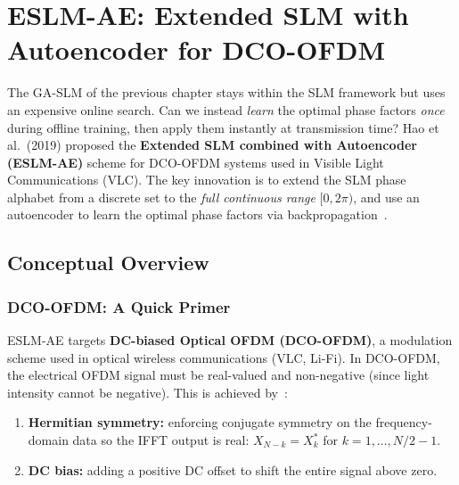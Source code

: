 \chapter{ESLM-AE: Extended SLM with Autoencoder for DCO-OFDM}
\label{ch:eslm_ae}

\begin{motivation}
    The GA-SLM of the previous chapter stays within the SLM framework but
    uses an expensive online search.  Can we instead \emph{learn} the optimal
    phase factors \emph{once} during offline training, then apply them
    instantly at transmission time?
    Hao et al.\ (2019) proposed the \textbf{Extended SLM combined with
    Autoencoder (ESLM-AE)} scheme for DCO-OFDM systems used in Visible
    Light Communications (VLC).  The key innovation is to extend the SLM
    phase alphabet from a discrete set to the \emph{full continuous range}
    $[0, 2\pi)$, and use an autoencoder to learn the optimal phase factors
    via backpropagation~\cite{hao2019extended}.
\end{motivation}


\section{Conceptual Overview}
\label{sec:eslm_concept}

\subsection{DCO-OFDM: A Quick Primer}

ESLM-AE targets \textbf{DC-biased Optical OFDM (DCO-OFDM)}, a modulation
scheme used in optical wireless communications (VLC, Li-Fi).
In DCO-OFDM, the electrical OFDM signal must be real-valued and non-negative
(since light intensity cannot be negative).  This is achieved
by~\cite{hao2019extended}:
\begin{enumerate}
    \item \textbf{Hermitian symmetry:} enforcing conjugate symmetry on the
          frequency-domain data so the IFFT output is real:
          $X_{N-k} = X_k^*$ for $k = 1, \dots, N/2-1$.
    \item \textbf{DC bias:} adding a positive DC offset to shift the entire
          signal above zero.
\end{enumerate}


